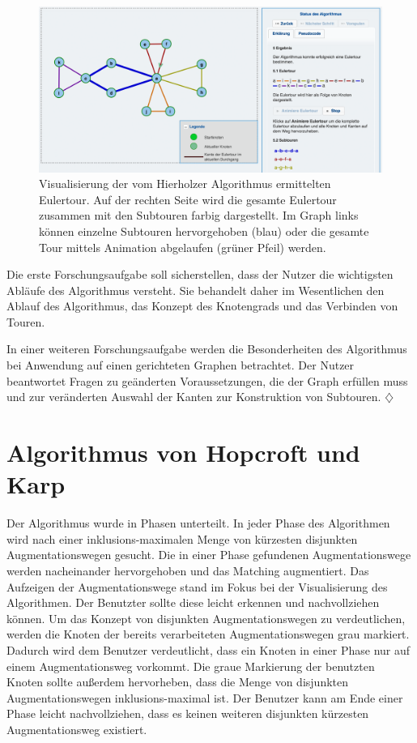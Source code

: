 \begin{figure}[h!]
	\centering
	\includegraphics[width=\textwidth]{figures/hierholzer_animation}
	\caption[Hierholzer: Eulertour Animation]{Visualisierung der vom Hierholzer Algorithmus ermittelten Eulertour. Auf der rechten Seite wird die gesamte Eulertour zusammen mit den Subtouren farbig dargestellt. Im Graph links können einzelne Subtouren hervorgehoben (blau) oder die gesamte Tour mittels Animation abgelaufen (grüner Pfeil) werden.}\label{fig:hierholzer-animation}
\end{figure}

Die erste Forschungsaufgabe soll sicherstellen, dass der Nutzer die wichtigsten Abläufe des Algorithmus versteht. Sie behandelt daher im Wesentlichen den Ablauf des Algorithmus, das Konzept des Knotengrads und das Verbinden von Touren.

In einer weiteren Forschungsaufgabe werden die Besonderheiten des Algorithmus bei Anwendung auf einen gerichteten Graphen betrachtet. Der Nutzer beantwortet Fragen zu geänderten Voraussetzungen, die der Graph erfüllen muss und zur veränderten Auswahl der Kanten zur Konstruktion von Subtouren. \hfill$\diamondsuit$
     
\section{Algorithmus von Hopcroft und Karp} %
Der Algorithmus wurde in Phasen unterteilt. In jeder Phase des Algorithmen wird nach einer inklusions-maximalen Menge von kürzesten disjunkten Augmentationswegen gesucht. Die in einer Phase gefundenen Augmentationswege werden nacheinander hervorgehoben und das Matching augmentiert.
Das Aufzeigen der Augmentationswege stand im Fokus bei der Visualisierung des Algorithmen. Der Benutzter sollte diese leicht erkennen und nachvollziehen können. Um das Konzept von disjunkten Augmentationswegen zu verdeutlichen, werden die Knoten der bereits verarbeiteten Augmentationswegen grau markiert. Dadurch wird dem Benutzer verdeutlicht, dass ein Knoten in einer Phase nur auf einem Augmentationsweg vorkommt. 
Die graue Markierung der benutzten Knoten sollte außerdem hervorheben, dass die Menge von disjunkten Augmentationswegen inklusions-maximal ist. Der Benutzer kann am Ende einer Phase leicht nachvollziehen, dass es keinen weiteren disjunkten kürzesten Augmentationsweg existiert.

